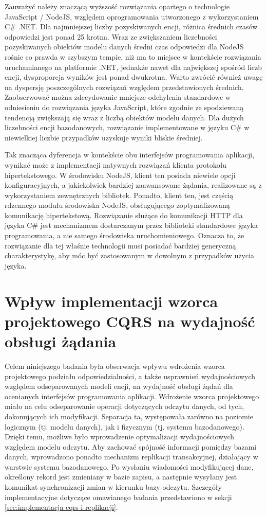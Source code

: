 Zauważyć należy znaczącą wyższość rozwiązania opartego o technologie JavaScript / NodeJS, względem oprogramowania utworzonego z wykorzystaniem C\# .NET. Dla najmniejszej liczby pozyskiwanych encji, różnica średnich czasów odpowiedzi jest ponad 25 krotna. Wraz ze zwiększaniem liczebności pozyskiwanych obiektów modelu danych średni czas odpowiedzi dla NodeJS rośnie co prawda w szybszym tempie, niż ma to miejsce w kontekście rozwiązania uruchamianego na platformie .NET, jednakże nawet dla największej spośród liczb encji, dysproporcja wyników jest ponad dwukrotna. Warto zwrócić również uwagę na dyspersję poszczególnych rozwiązań względem przedstawionych średnich. Zaobserwować można zdecydowanie mniejsze odchylenia standardowe w odniesieniu do rozwiązania języka JavaScript, które zgodnie ze spodziewaną tendencją zwiększają się wraz z liczbą obiektów modelu danych. Dla dużych liczebności encji bazodanowych, rozwiązanie implementowane w języku C\# w niewielkiej liczbie przypadków uzyskuje wyniki bliskie średniej.

Tak znacząca dyferencja w kontekście obu interfejsów programowania aplikacji, wynikać może z implementacji natywnych rozwiązań klienta protokołu hipertekstowego. W środowisku NodeJS, klient ten posiada niewiele opcji konfiguracyjnych, a jakiekolwiek bardziej zaawansowane żądania, realizowane są z wykorzystaniem zewnętrznych bibliotek. Ponadto, klient ten, jest częścią rdzennego modułu środowiska NodeJS, obsługującego zoptymalizowaną komunikację hipertekstową. Rozwiązanie służące do komunikacji HTTP dla języka C\# jest mechanizmem dostarczanym przez biblioteki standardowe języka programowania, a nie samego środowiska uruchomieniowego. Oznacza to, że rozwiązanie dla tej właśnie technologii musi posiadać bardziej generyczną charakterystykę, aby móc być zastosowanym w dowolnym z przypadków użycia języka.
\section{Wpływ implementacji wzorca projektowego CQRS na wydajność obsługi żądania}
\label{sec:cqrs-and-database-improvements}
Celem niniejszego badania była obserwacja wpływu wdrożenia wzorca projektowego podziału odpowiedzialności, a także usprawnień wydajnościowych względem odseparowanych modeli encji, na wydajność obsługi żądań dla ocenianych interfejsów programowania aplikacji. Wdrożenie wzorca projektowego miało na celu odseparowanie operacji dotyczących odczytu danych, od tych, dokonujących ich modyfikacji. Separacja ta, występowała zarówno na poziomie logicznym (tj. modelu danych), jak i fizycznym (tj. systemu bazodanowego). Dzięki temu, możliwe było wprowadzenie optymalizacji wydajnościowych względem modelu odczytu. Aby zachować spójność informacji pomiędzy bazami danych, wprowadzono ponadto mechanizm replikacji transakcyjnej, działający w warstwie systemu bazodanowego. Po wysłaniu wiadomości modyfikującej dane, określony rekord jest zmieniany w bazie zapisu, a następnie wysyłany jest komunikat synchronizacji zmian w kierunku bazy odczytu. Szczegóły implementacyjne dotyczące omawianego badania przedstawiono w sekcji \ref{sec:implementacja-cqrs-i-replikacji}.

